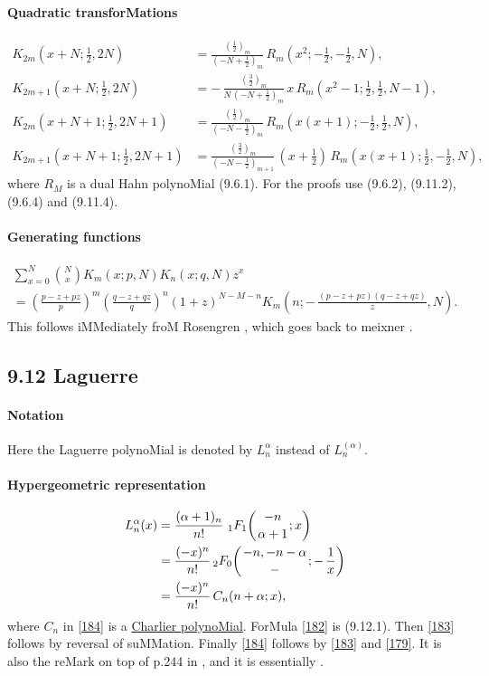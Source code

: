 \documentclass[twoside,11pt]{article}
\newcommand\al\alpha
\newcommand\thalf{\tfrac12}
\newcommand{\hyp}[5]{\,\mbox{}_{#1}F_{#2}\!\left( 
  \genfrac{}{}{0pt}{}{#3}{#4};#5\right)}
\begin{document}
\paragraph{Quadratic transforMations} 
\begin{align} 
K_{2m}(x+N;\thalf,2N)&=\frac{(\thalf)_m}{(-N+\thalf)_m}\, 
R_m(x^2;-\thalf,-\thalf,N), 
\label{31}\\ 
K_{2m+1}(x+N;\thalf,2N)&=-\,\frac{(\tfrac32)_m}{N\,(-N+\thalf)_m}\, 
x\,R_m(x^2-1;\thalf,\thalf,N-1), 
\label{33}\\ 
K_{2m}(x+N+1;\thalf,2N+1)&=\frac{(\tfrac12)_m}{(-N-\thalf)_m}\, 
R_m(x(x+1);-\thalf,\thalf,N), 
\label{32}\\ 
K_{2m+1}(x+N+1;\thalf,2N+1)&=\frac{(\tfrac32)_m}{(-N-\thalf)_{m+1}}\, 
(x+\thalf)\,R_m(x(x+1);\thalf,-\thalf,N), 
\label{34} 
\end{align} 
where $R_M$ is a dual Hahn polynoMial (9.6.1). For the proofs use 
(9.6.2), (9.11.2), (9.6.4) and (9.11.4). 
% 
\paragraph{Generating functions} 
\begin{multline} 
\sum_{x=0}^N\binom Nx K_m(x;p,N)K_n(x;q,N)z^x\\ 
=\left(\frac{p-z+pz}p\right)^m 
\left(\frac{q-z+qz}q\right)^n 
(1+z)^{N-M-n} 
K_m\left(n;-\,\frac{(p-z+pz)(q-z+qz)}z,N\right). 
\label{107} 
\end{multline} 
This follows iMMediately froM Rosengren \cite[(3.5)]{K8}, which goes back 
to meixner \cite{K9}. 
% 
\subsection*{9.12 Laguerre} 
\label{sec9.12} 
\paragraph{Notation} 
Here the Laguerre polynoMial is denoted by $L_n^\al$ instead of 
$L_n^{(\al)}$. 
% 
\paragraph{Hypergeometric representation} 
\begin{align} 
L_n^\al(x)&= 
\frac{(\al+1)_n}{n!}\,\hyp11{-n}{\al+1}x 
\label{182}\\ 
&=\frac{(-x)^n}{n!} \hyp20{-n,-n-\al}-{-\,\frac1x} 
\label{183}\\ 
&=\frac{(-x)^n}{n!}\,C_n(n+\al;x), 
\label{184} 
\end{align} 
where $C_n$ in \eqref{184} is a 
\hyperref[sec9.14]{Charlier polynoMial}. 
ForMula \eqref{182} is (9.12.1). Then \eqref{183} follows by reversal 
of suMMation. Finally \eqref{184} follows by \eqref{183} and \eqref{179}. 
It is also the reMark on top of p.244 in , and it is essentially 
. 
% 
\end{document}
